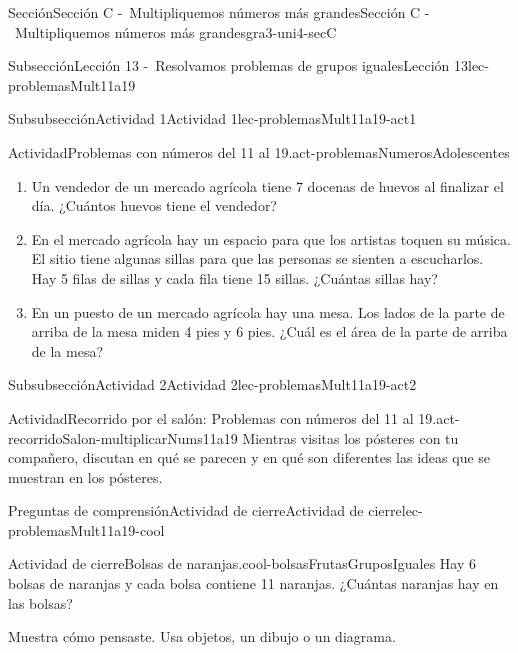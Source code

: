 \documentclass[twoside,10pt,]{article}
\begin{document}
\begin{sectionptx}{Sección}{Sección C -~Multipliquemos números más grandes}{}{Sección C -~Multipliquemos números más grandes}{}{}{gra3-uni4-secC}
\begin{subsectionptx}{Subsección}{Lección 13 -~Resolvamos problemas de grupos iguales}{}{Lección 13}{}{}{lec-problemasMult11a19}
\begin{subsubsectionptx}{Subsubsección}{Actividad 1}{}{Actividad 1}{}{}{lec-problemasMult11a19-act1}
\begin{activity}{Actividad}{Problemas con números del 11 al 19.}{act-problemasNumerosAdolescentes}
\begin{sidebyside}{2}{0.05}{0.05}{0.1}
\begin{sbspanel}{0.3}
\end{sbspanel}%
\end{sidebyside}%
%
\begin{enumerate}
\item{}Un vendedor de un mercado agrícola tiene 7 docenas de huevos al finalizar el día. ¿Cuántos huevos tiene el vendedor?%
\item{}En el mercado agrícola hay un espacio para que los artistas toquen su música. El sitio tiene algunas sillas para que las personas se sienten a escucharlos. Hay 5 filas de sillas y cada fila tiene 15 sillas. ¿Cuántas sillas hay?%
\item{}En un puesto de un mercado agrícola hay una mesa. Los lados de la parte de arriba de la mesa miden 4 pies y 6 pies. ¿Cuál es el área de la parte de arriba de la mesa?%
\end{enumerate}
\end{activity}%
\end{subsubsectionptx}
%
%
\typeout{************************************************}
\typeout{************************************************}
%
\begin{subsubsectionptx}{Subsubsección}{Actividad 2}{}{Actividad 2}{}{}{lec-problemasMult11a19-act2}
\begin{activity}{Actividad}{Recorrido por el salón: Problemas con números del 11 al 19.}{act-recorridoSalon-multiplicarNums11a19}%
Mientras visitas los pósteres con tu compañero, discutan en qué se parecen y en qué son diferentes las ideas que se muestran en los pósteres.%
\end{activity}%
\end{subsubsectionptx}
%
%
\typeout{************************************************}
\typeout{************************************************}
%
\begin{reading-questions-subsubsection}{Preguntas de comprensión}{Actividad de cierre}{}{Actividad de cierre}{}{}{lec-problemasMult11a19-cool}
\begin{project}{Actividad de cierre}{Bolsas de naranjas.}{cool-bolsasFrutasGruposIguales}%
Hay 6 bolsas de naranjas y cada bolsa contiene 11 naranjas. ¿Cuántas naranjas hay en las bolsas?%
\par
Muestra cómo pensaste. Usa objetos, un dibujo o un diagrama.%
\end{project}%
\end{reading-questions-subsubsection}
\end{subsectionptx}

\end{sectionptx}
\end{document}
